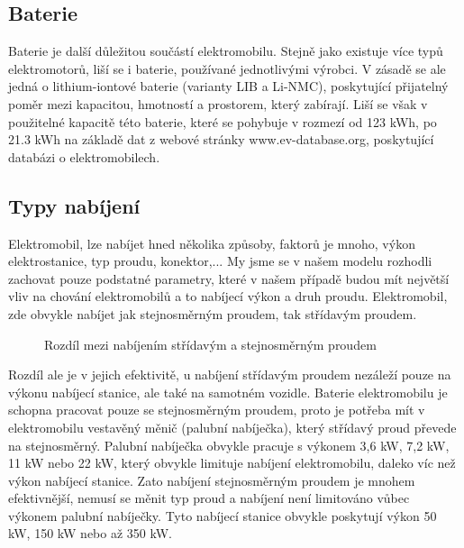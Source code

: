 \documentclass[a4paper,11pt]{article}
\begin{document}
\subsection{Baterie}
Baterie je další důležitou součástí elektromobilu. Stejně jako existuje více typů elektromotorů, 
liší se i baterie, používané jednotlivými výrobci. V zásadě se ale jedná o lithium-iontové baterie
(varianty LIB a Li-NMC), poskytující přijatelný poměr mezi kapacitou, hmotností a prostorem, který 
zabírají.\cite{baterie_ev_wiki} Liší se však v použitelné kapacitě této baterie, které se pohybuje 
v rozmezí od 123 kWh, po 21.3 kWh na základě dat z webové stránky www.ev-database.org\cite{ev_database}, 
poskytující databázi o elektromobilech.

\subsection{Typy nabíjení}
Elektromobil, lze nabíjet hned několika způsoby, faktorů je mnoho, výkon elektrostanice, typ proudu, konektor,...
My jsme se v našem modelu rozhodli zachovat pouze podstatné parametry, které v našem případě budou mít největší 
vliv na chování elektromobilů a to nabíjecí výkon a druh proudu. Elektromobil, zde obvykle nabíjet jak 
stejnosměrným proudem, tak střídavým proudem.

\begin{figure}[H]
    \centering
    \caption{Rozdíl mezi nabíjením střídavým a stejnosměrným proudem \cite{rozdil_mezi_ac_dc_nabijenim}}
    \label{figure:difference-between-ac-and-cd-charging-ev}
\end{figure}

Rozdíl ale je v jejich efektivitě, u nabíjení střídavým proudem nezáleží pouze na výkonu nabíjecí stanice, 
ale také na samotném vozidle. Baterie elektromobilu je schopna pracovat pouze se stejnosměrným proudem, 
proto je potřeba mít v elektromobilu vestavěný měnič (palubní nabíječka), který střídavý proud převede 
na stejnosměrný. Palubní nabíječka obvykle pracuje s výkonem 3,6 kW, 7,2 kW, 11 kW nebo 22 kW,
který obvykle limituje nabíjení elektromobilu, daleko víc než výkon nabíjecí stanice. \cite{nabijeni_ev}
Zato nabíjení stejnosměrným proudem je mnohem efektivnější, nemusí se měnit typ proud a nabíjení není limitováno
vůbec výkonem palubní nabíječky. Tyto nabíjecí stanice obvykle poskytují výkon 50 kW, 150 kW nebo až 350 kW.\cite{nabijeni_ev, data_brno}
\end{document}
